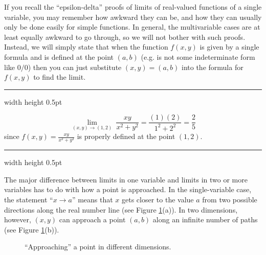 If you recall the ``epsilon-delta'' proofs of limits of real-valued functions of a single variable, you may remember
how awkward they can be, and how they can usually only be done easily for simple functions. In general, the
multivariable cases are at least equally awkward to go through, so we will not bother with such proofs. Instead, we
will simply state that when the function $f(x,y)$ is given by a single formula and is defined at the point
$(a,b)$ (e.g. is not some indeterminate form like $0/0$) then you can just substitute $(x,y) = (a,b)$ into the formula
for $f(x,y)$ to find the limit.

\vspace{4mm}
\hrule width \textwidth height 0.5pt
\begin{exmp}
 \begin{displaymath}
 \lim_{(x,y) \to (1,2)}~ \frac{xy}{x^2 + y^2} = \frac{(1)(2)}{1^2 + 2^2} = \frac{2}{5}
 \end{displaymath}
 since $f(x,y) = \frac{xy}{x^2 + y^2}$ is properly defined at the point $(1,2)$.
\end{exmp}
\hrule width \textwidth height 0.5pt
\vspace{4mm}

The major difference between limits in one variable and limits in two or more variables has to do with how a point is
approached. In the single-variable case, the statement ``$x \rightarrow a$'' means that $x$ gets closer to the value $a$
from two possible directions along the real number line (see
Figure \ref{fig:mlim}(a)). In two dimensions, however, $(x,y)$ can approach a point $(a,b)$ along an infinite
number of paths (see Figure \ref{fig:mlim}(b)).

\begin{figure}[h]
 \centering
 \qquad
 \caption[]{\quad ``Approaching'' a point in different dimensions.}
 \label{fig:mlim}
\end{figure}


